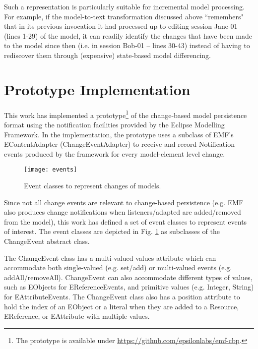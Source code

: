 Such a representation is particularly suitable for incremental model processing. For example, if the model-to-text transformation discussed above ``remembers" that in its previous invocation it had processed up to editing session \textsf{Jane-01} (lines 1-29) of the model, it can readily identify the changes that have been made to the model since then (i.e. in session \textsf{Bob-01} -- lines 30-43) instead of having to rediscover them through (expensive) state-based model differencing.

\section{Prototype Implementation}
\label{sec:prototype_implementation}
This work has implemented a prototype\footnote{The prototype is available under \url{https://github.com/epsilonlabs/emf-cbp}.} of the change-based model persistence format using the notification facilities provided by the Eclipse Modelling Framework. In the implementation, the prototype uses a subclass of EMF's \textsf{EContentAdapter} (\textsf{ChangeEventAdapter}) to receive and record \textsf{Notification} events produced by the framework for every model-element level change.

\begin{figure}[th]
    \centering
    \texttt{[image: events]}
    \caption{Event classes to represent changes of models.}
    \label{fig:events}
\end{figure}

Since not all change events are relevant to change-based persistence (e.g. EMF also produces change notifications when listeners/adapted are added/removed from the model), this work has defined a set of event classes to represent events of interest. The event classes are depicted in Fig. \ref{fig:events} as subclasses of the \textsf{ChangeEvent} abstract class.

The \textsf{ChangeEvent} class has a multi-valued \textsf{values} attribute which can accommodate both single-valued (e.g. set/add) or multi-valued events (e.g. addAll/removeAll). \textsf{ChangeEvent} can also accommodate different types of values, such as \textsf{EObject}s for \textsf{EReferenceEvents}, and primitive values (e.g. Integer, String) for \textsf{EAttributeEvents}. The \textsf{ChangeEvent} class also has a position attribute to hold the  index of an \textsf{EObject} or a literal when they are added to a \textsf{Resource}, \textsf{EReference}, or \textsf{EAttribute} with multiple values. 

